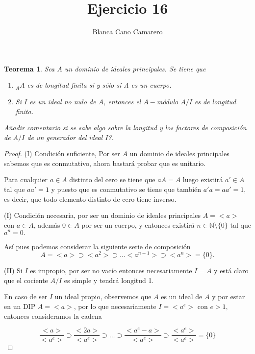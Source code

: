 \documentclass{article}
\title{Ejercicio 16}
\author{Blanca Cano Camarero}
\newtheorem*{teorema*}{Teorema}
\newcommand{\N}{\mathbb{N}}
\begin{document}
\maketitle

\begin{teorema*}
    Sea $A$ un dominio de ideales principales. 
    Se tiene que
    \begin{enumerate}[i]
        \item ${_A}A$ es de longitud finita si y sólo si A es un cuerpo.
        \item Si $I$ es un ideal no nulo de $A$, entonces el $A-$módulo $A/I$ es de longitud finita. 
    \end{enumerate}
    Añadir comentario si se sabe algo sobre la longitud y los factores de composición de $A/I$ de un generador del ideal $I$?.
\end{teorema*}   

\begin{proof}
(I) Condición suficiente, Por ser $A$ un dominio de ideales principales sabemos que es conmutativo, ahora bastará probar que es unitario. 

Para cualquier $a \in A$ distinto del cero se tiene que 
$a A = A$ luego existirá $a' \in A$ tal que 
$a a'=1$ y puesto que es conmutativo se tiene que también 
$a' a = a a'=1$, es decir, que todo elemento distinto de cero tiene inverso. 

(I) Condición necesaria, por ser un dominio de ideales principales 
$A = <a>$ con $a \in A$, además $0 \in A$ por ser un cuerpo, y entonces existirá $n \in \N \setminus \{0\}$ tal que $a^n = 0.$

Así pues podemos considerar la siguiente serie de composición 
\begin{equation*}
    A = <a> \supset 
    <a^2> 
    \supset 
    \ldots 
    <a^{n-1}>
    \supset
    <a^n> = \{0\}.
\end{equation*}

(II) Si $I$ es impropio, por ser no vacío entonces necesariamente 
$I=A$ y está claro que el cociente $A/I$ es simple y tendrá longitud 1. 

En caso de ser $I$ un ideal propio, observemos que 
$A$ es un ideal de $A$ y por estar en un DIP $A=<a>$, por lo que 
necesariamente $I= <a^e>$ con $e > 1$, entonces consideramos la cadena

\begin{equation*}
    \frac{<a>}{<a^e>} \supset  \frac{<2a>}{<a^e>} 
    \supset \ldots \supset
    \frac{<a^e -a>}{<a^e>}
    \supset
    \frac{<a^e>}{<a^e>} = \{0\}
\end{equation*}
\end{proof}
\end{document}
